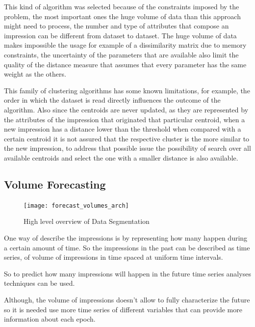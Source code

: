 This kind of algorithm was selected because of the constraints imposed by the
problem, the most important ones the huge volume of data than this approach
might need to process, the number and type of attributes that compose an
impression can be different from dataset to dataset. The huge volume of data
makes impossible the usage for example of a dissimilarity matrix due to memory
constraints, the uncertainty of the parameters that are available also limit the
quality of the distance measure that assumes that every parameter has the same
weight as the others.

This family of clustering algorithms has some known limitations, for example, the
order in which the dataset is read directly influences the outcome of the
algorithm. Also since the centroids are never updated, as they are represented
by the attributes of the impression that originated that particular centroid,
when a new impression has a distance lower than the threshold when compared with
a certain centroid it is not assured that the respective cluster is the more
similar to the new impression, to address that possible issue the possibility of
search over all available centroids and select the one with a smaller distance
is also available.

\subsection{Volume Forecasting}\label{subsec:volume_forecast}

\begin{figure}[h] \begin{center} \leavevmode
\texttt{[image: forecast\_volumes\_arch]} \caption{ High level overview
of Data Segmentation} \label{fig:forecast_volumes_arch} \end{center} \end{figure}

One way of describe the impressions is by representing how many happen during a
certain amount of time. So the impressions in the past can be described as time
series, of volume of impressions in time spaced at uniform time intervals. 

So to predict how many impressions will happen in the future time series
analyses techniques can be used. 

Although, the volume of impressions doesn't allow to fully characterize the future so
 it is needed use more time series of different variables that can provide more
 information about each epoch.

